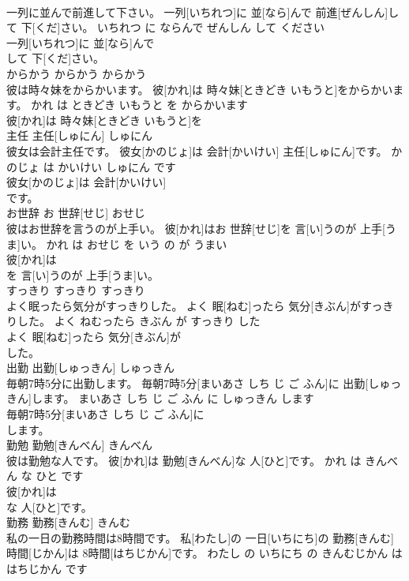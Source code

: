 \documentclass[8pt]{extreport}
\begin{document}
\begin{CJK}{UTF8}{min}
\\	一列に並んで前進して下さい。	一列[いちれつ]に 並[なら]んで 前進[ぜんしん]して 下[くだ]さい。	いちれつ に ならんで ぜんしん して ください	
\\	一列[いちれつ]に 並[なら]んで
\\	して 下[くだ]さい。			
\\	からかう	からかう	からかう	
\\	彼は時々妹をからかいます。	彼[かれ]は 時々妹[ときどき いもうと]をからかいます。	かれ は ときどき いもうと を からかいます	
\\	彼[かれ]は 時々妹[ときどき いもうと]を
\\	主任	主任[しゅにん]	しゅにん	
\\	彼女は会計主任です。	彼女[かのじょ]は 会計[かいけい] 主任[しゅにん]です。	かのじょ は かいけい しゅにん です	
\\	彼女[かのじょ]は 会計[かいけい]
\\	です。			
\\	お世辞	お 世辞[せじ]	おせじ	
\\	彼はお世辞を言うのが上手い。	彼[かれ]はお 世辞[せじ]を 言[い]うのが 上手[うま]い。	かれ は おせじ を いう の が うまい	
\\	彼[かれ]は
\\	を 言[い]うのが 上手[うま]い。			
\\	すっきり	すっきり	すっきり	
\\	よく眠ったら気分がすっきりした。	よく 眠[ねむ]ったら 気分[きぶん]がすっきりした。	よく ねむったら きぶん が すっきり した	
\\	よく 眠[ねむ]ったら 気分[きぶん]が
\\	した。			
\\	出勤	出勤[しゅっきん]	しゅっきん	
\\	毎朝7時5分に出勤します。	毎朝7時5分[まいあさ しち じ ご ふん]に 出勤[しゅっきん]します。	まいあさ しち じ ご ふん に しゅっきん します	
\\	毎朝7時5分[まいあさ しち じ ご ふん]に
\\	します。			
\\	勤勉	勤勉[きんべん]	きんべん	
\\	彼は勤勉な人です。	彼[かれ]は 勤勉[きんべん]な 人[ひと]です。	かれ は きんべん な ひと です	
\\	彼[かれ]は
\\	な 人[ひと]です。			
\\	勤務	勤務[きんむ]	きんむ	
\\	私の一日の勤務時間は8時間です。	私[わたし]の 一日[いちにち]の 勤務[きんむ] 時間[じかん]は 8時間[はちじかん]です。	わたし の いちにち の きんむじかん は はちじかん です	

\end{CJK}
\end{document}
